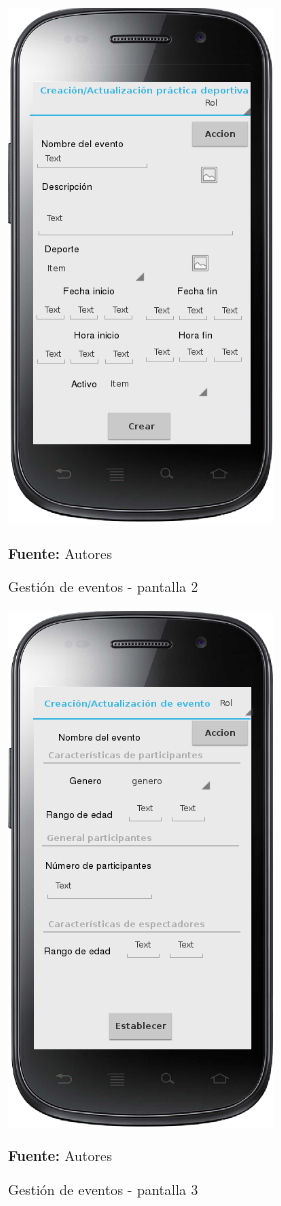 \begin{figure}[!htb]
  \begin{center}
    \includegraphics[width=7cm]{./imagenes/UI/Eventos/gestion_eventos_2.png}
    \caption{Gestión de eventos - pantalla 2}
    \label{fig:gestion_eventos_2}
    \textbf{Fuente:}  Autores
  \end{center}
\end{figure}

\begin{figure}[!htb]
  \begin{center}
    \includegraphics[width=7cm]{./imagenes/UI/Eventos/gestion_eventos_3.png}
    \caption{Gestión de eventos - pantalla 3}
    \label{fig:gestion_eventos_3}
    \textbf{Fuente:}  Autores
  \end{center}
\end{figure}

